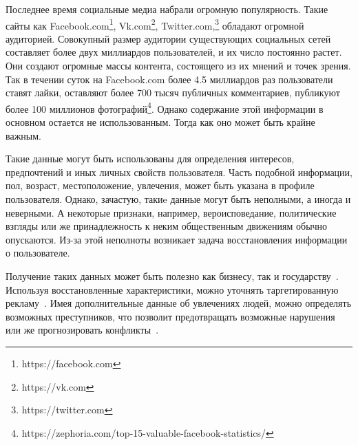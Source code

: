 \documentclass[annotation,times,page4]{itmo-student-thesis}
\begin{document}

\makemastertitle

\tableofcontents

\startprefacepage

Последнее время социальные медиа набрали огромную популярность. Такие сайты как Facebook.com\footnote{https://facebook.com}, Vk.com\footnote{https://vk.com}, Twitter.com,\footnote{https://twitter.com} обладают огромной аудиторией. Совокупный размер аудитории существующих социальных сетей составляет более двух миллиардов пользователей, и их число постоянно растет. Они создают огромные массы контента, состоящего из их мнений и точек зрения. Так в течении суток на Facebook.com более 4.5 миллиардов раз пользователи ставят лайки, оставляют более 700 тысяч публичных комментариев, публикуют более 100 миллионов фотографий\footnote{https://zephoria.com/top-15-valuable-facebook-statistics/}. Однако содержание этой информации в основном остается не использованным. Тогда как оно может быть крайне важным.

Такие данные могут быть использованы для определения интересов, предпочтений и иных личных свойств пользователя. Часть подобной информации, пол, возраст,  местоположение, увлечения, может быть указана в профиле пользователя. Однако, зачастую, такиe данные могут быть неполными, а иногда и неверными. А некоторые признаки, например, вероисповедание, политические взгляды или же принадлежность к неким общественным движениям обычно опускаются. Из-за этой неполноты возникает задача восстановления информации о пользователе.

Получение таких данных может быть полезно как бизнесу, так и государству~\cite{ramakrishnan2014beating}. Используя восстановленные характеристики, можно уточнять таргетированную рекламу~\cite{swearingen2001beyond}. Имея дополнительные данные об увлечениях людей, можно определять возможных преступников, что позволит предотвращать возможные нарушения или же прогнозировать конфликты~\cite{grothoff2016nsa}.
\end{document}
